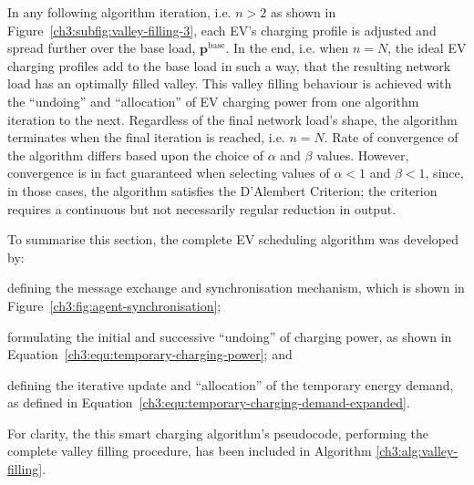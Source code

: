 In any following algorithm iteration, i.e. $n>2$ as shown in Figure~\ref{ch3:subfig:valley-filling-3}, each EV's charging profile is adjusted and spread further over the base load, $\textbf{p}^\text{base}$.
In the end, i.e. when $n=N$, the ideal EV charging profiles add to the base load in such a way, that the resulting network load has an optimally filled valley.
This valley filling behaviour is achieved with the ``undoing'' and ``allocation'' of EV charging power from one algorithm iteration to the next.
Regardless of the final network load's shape, the algorithm terminates when the final iteration is reached, i.e. $n=N$.
Rate of convergence of the algorithm differs based upon the choice of $\alpha$ and $\beta$ values.
However, convergence is in fact guaranteed when selecting values of $\alpha < 1$ and $\beta < 1$, since, in those cases, the algorithm satisfies the D'Alembert Criterion; the criterion requires a continuous but not necessarily regular reduction in output.

To summarise this section, the complete EV scheduling algorithm was developed by: 
\begin{enumerate*}
	\item defining the message exchange and synchronisation mechanism, which is shown in Figure~\ref{ch3:fig:agent-synchronisation};
	\item formulating the initial and successive ``undoing'' of charging power, as shown in Equation~\ref{ch3:equ:temporary-charging-power}; and
	\item defining the iterative update and ``allocation'' of the temporary energy demand, as defined in Equation~\ref{ch3:equ:temporary-charging-demand-expanded}.
\end{enumerate*}
For clarity, the this smart charging algorithm's pseudocode, performing the complete valley filling procedure, has been included in Algorithm \ref{ch3:alg:valley-filling}.















